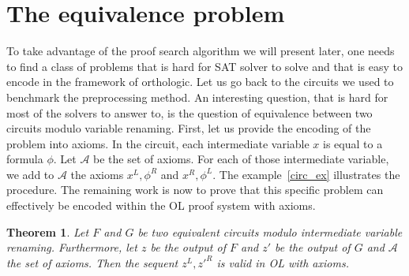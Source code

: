 \documentclass[a4paper, 11pt]{article}
\newtheorem{theorem}{Theorem}
\begin{document}
    \section{The equivalence problem}
    \label{equiv_section}
    To take advantage of the proof search algorithm we will present later, one needs to find a class of 
    problems
    that is hard for SAT solver to solve and that is easy to encode in the framework of orthologic.
    Let us go back to the circuits we used to benchmark the preprocessing method. An interesting
    question, that is hard for most of the solvers to answer to, is the question of equivalence between
    two circuits modulo variable renaming. First, let us provide the encoding of the problem into axioms.
    In the circuit, each intermediate variable $x$ is equal to a formula $\phi$. Let $\mathcal{A}$ be the
    set of axioms. For each of those intermediate variable, we add to $\mathcal{A}$ the axioms 
    $x^L,\phi^R$ and $x^R,\phi^L$. The example~\ref{circ_ex} illustrates the procedure. 
    The remaining work is now to prove that this specific problem
    can effectively be encoded within the OL proof system with axioms.
    \begin{theorem}
	    \label{th_equiv}
	    Let $F$ and $G$ be two equivalent circuits modulo intermediate variable renaming.
	    Furthermore, let $z$ be the output of $F$ and $z'$ be the output of $G$ and $\mathcal{A}$
	    the set of axioms. Then the sequent $z^L,z'^R$ is valid in OL with axioms. 
    \end{theorem}
\end{document}
